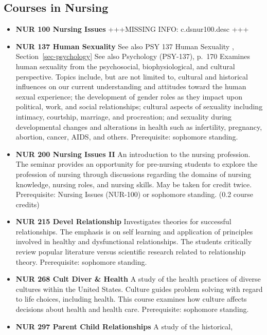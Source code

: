 \documentclass[
  letterpaper,
]{scrbook}
\providecommand{\tightlist}{%
  \setlength{\itemsep}{0pt}\setlength{\parskip}{0pt}}
\begin{document}
\subsection{Courses in Nursing}\label{courses-in-nursing}

\begin{itemize}
\tightlist
\item
  \textbf{NUR 100 Nursing Issues} +++MISSING INFO: c.dsnur100.desc +++\\
\item
  \textbf{NUR 137 Human Sexuality} See also PSY 137 Human Sexuality ,
  Section~\ref{sec-psychology} See also Psychology (PSY-137), p.~170
  Examines human sexuality from the psychosocial, biophysiological, and
  cultural perspective. Topics include, but are not limited to, cultural
  and historical influences on our current understanding and attitudes
  toward the human sexual experience; the development of gender roles as
  they impact upon political, work, and social relationships; cultural
  aspects of sexuality including intimacy, courtship, marriage, and
  procreation; and sexuality during developmental changes and
  alterations in health such as infertility, pregnancy, abortion,
  cancer, AIDS, and others. Prerequisite: sophomore standing.
\item
  \textbf{NUR 200 Nursing Issues II} An introduction to the nursing
  profession. The seminar provides an opportunity for pre-nursing
  students to explore the profession of nursing through discussions
  regarding the domains of nursing knowledge, nursing roles, and nursing
  skills. May be taken for credit twice. Prerequisite: Nursing Issues
  (NUR-100) or sophomore standing. (0.2 course credits)
\item
  \textbf{NUR 215 Devel Relationship} Investigates theories for
  successful relationships. The emphasis is on self learning and
  application of principles involved in healthy and dysfunctional
  relationships. The students critically review popular literature
  versus scientific research related to relationship theory.
  Prerequisite: sophomore standing.\\
\item
  \textbf{NUR 268 Cult Diver \& Health} A study of the health practices
  of diverse cultures within the United States. Culture guides problem
  solving with regard to life choices, including health. This course
  examines how culture affects decisions about health and health care.
  Prerequisite: sophomore standing.
\item
  \textbf{NUR 297 Parent Child Relationships} A study of the historical,

\end{itemize}
\end{document}
